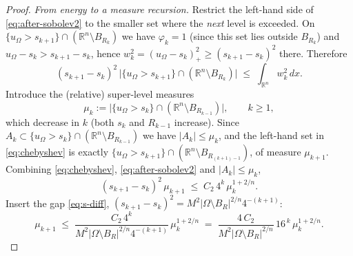 \documentclass[11pt]{amsart}
\theoremstyle{definition}
\newcommand{\R}{\mathbb R}
\newcommand{\Om}{\Omega}
\newcommand{\abs}[1]{\left|#1\right|}
\newcommand{\dx}{\,dx}
\begin{document}
\begin{proof}
\smallskip
\emph{From energy to a measure recursion.} Restrict the left-hand side of
\eqref{eq:after-sobolev2} to the smaller set where the \emph{next} level
is exceeded. On $\{u_\Om>s_{k+1}\}\cap(\R^n\setminus B_{R_{k}})$ we have
$\varphi_k=1$ (since this set lies outside $B_{R_k}$) and
$u_\Om-s_k>s_{k+1}-s_k$, hence
$w_k^2=(u_\Om-s_k)_+^2\ge(s_{k+1}-s_k)^2$ there. Therefore
\begin{equation}\label{eq:chebyshev}
   (s_{k+1}-s_k)^2\,
   \bigl|\{u_\Om>s_{k+1}\}\cap(\R^n\setminus B_{R_{k}})\bigr|
   \;\le\;\int_{\R^n}w_k^2\dx .
\end{equation}
Introduce the (relative) super-level measures
\[
   \mu_k:=\bigl|\{u_\Om>s_k\}\cap(\R^n\setminus B_{R_{k-1}})\bigr|,
   \qquad k\ge1,
\]
which decrease in $k$ (both $s_k$ and $R_{k-1}$ increase). Since
$A_k\subset\{u_\Om>s_k\}\cap(\R^n\setminus B_{R_{k-1}})$ we have
$\abs{A_k}\le\mu_k$, and the left-hand set in \eqref{eq:chebyshev} is
exactly $\{u_\Om>s_{k+1}\}\cap(\R^n\setminus B_{R_{(k+1)-1}})$, of
measure $\mu_{k+1}$.
Combining \eqref{eq:chebyshev},
\eqref{eq:after-sobolev2} and $\abs{A_k}\le\mu_k$,
\[
   (s_{k+1}-s_k)^2\,\mu_{k+1}
   \;\le\;C_2\,4^{k}\,\mu_k^{1+2/n}.
\]
Insert the gap \eqref{eq:s-diff},
$(s_{k+1}-s_k)^2=M^2\abs{\Om\setminus B_R}^{2/n}4^{-(k+1)}$:
\begin{equation}\label{eq:mu-recursion}
   \mu_{k+1}\;\le\;
   \frac{C_2\,4^{k}}{M^2\abs{\Om\setminus B_R}^{2/n}4^{-(k+1)}}\,
   \mu_k^{1+2/n}
   \;=\;\frac{4\,C_2}{M^2\abs{\Om\setminus B_R}^{2/n}}\,16^{\,k}\,
   \mu_k^{1+2/n}.
\end{equation}


\end{proof}
\end{document}
